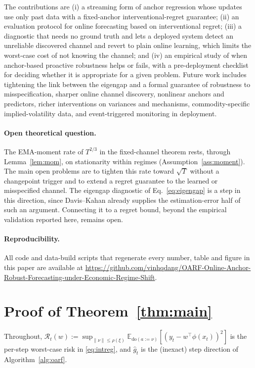 \documentclass[11pt]{article}
\theoremstyle{plain}
\theoremstyle{remark}
\newcommand{\E}{\mathbb{E}}
\newcommand{\doop}{\mathrm{do}}
\begin{document}
The contributions are (i) a
streaming form of anchor regression whose updates use only past data with a fixed-anchor interventional-regret
guarantee; (ii) an evaluation protocol for online forecasting based on
interventional regret; (iii) a diagnostic
that needs no ground truth and lets a deployed system detect an unreliable discovered
channel and revert to plain online learning, which limits the worst-case cost of not
knowing the channel; and (iv) an empirical study of when anchor-based proactive
robustness helps or fails, with a pre-deployment checklist for deciding whether it is
appropriate for a given problem. Future work includes tightening the link between the
eigengap and a formal guarantee of robustness to misspecification, sharper online
channel discovery, nonlinear anchors and predictors, richer interventions on variances
and mechanisms, commodity-specific implied-volatility data, and event-triggered
monitoring in deployment.

\paragraph{Open theoretical question.} The EMA-moment rate of $T^{2/3}$ in the
fixed-channel theorem rests, through Lemma~\ref{lem:mom}, on stationarity within regimes
(Assumption~\ref{ass:moment}). The main open problems are to tighten this rate toward
$\sqrt{T}$ without a changepoint trigger and to extend a regret guarantee to the
learned or misspecified channel. The eigengap diagnostic of Eq.~\eqref{eq:eigengap} is
a step in this direction, since Davis--Kahan already supplies the estimation-error half
of such an argument. Connecting it to a regret bound, beyond the empirical validation
reported here, remains open.

\paragraph{Reproducibility.} All code and data-build scripts that regenerate every
number, table and figure in this paper are available at
\url{https://github.com/vinhqdang/OARF-Online-Anchor-Robust-Forecasting-under-Economic-Regime-Shift}.

\section{Proof of Theorem~\ref{thm:main}}\label{app:proof}
Throughout, $\mathcal{R}_t(w):=\sup_{\|\nu\|\le\rho(\xi)}\E_{\doop(a:=\nu)}
[(y_t-w^\top\phi(x_t))^2]$ is the per-step worst-case risk in \eqref{eq:intreg}, and
$\hat g_t$ is the (inexact) step direction of Algorithm~\ref{alg:oarf}.
\end{document}
